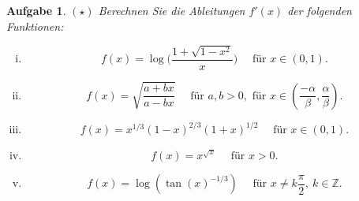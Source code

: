 \documentclass[a4paper, 20]{exam}
\newtheorem{ex}{Aufgabe}
\newcommand\ZZ{\mathbb{Z}}
\begin{document}
\begin{ex}{$(\star)$}
Berechnen Sie die Ableitungen $f'(x)$ der folgenden Funktionen:
\begin{enumerate}[i.)]
\item
$$ f(x)= \log\bigg(\frac{1 + \sqrt{1-x^2}}{x}\bigg)  \quad \text{ f\"ur } x \in (0,1).$$
\item
$$f(x)= \sqrt{\frac{a+bx}{a-bx}}  \quad \text{ f\"ur } a,b>0,  \text{ f\"ur } x\in \left( \frac{-\alpha}{\beta}, \frac{\alpha}{\beta} \right).$$
\item
$$f(x) = x^{1/3}(1-x)^{2/3}(1+x)^{1/2}  \quad \text{ f\"ur } x\in (0,1).$$
\item
$$f(x)= x^{\sqrt{x}}  \quad \text{ f\"ur } x>0.$$
\item
$$f(x) = \log(\tan(x)^{-1/3}) \quad \text{ f\"ur } x\neq k \frac{\pi}{2},\ k \in \ZZ. $$
\end{enumerate}
\end{ex}
\end{document}
